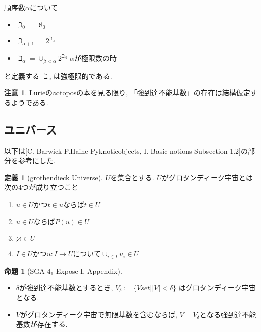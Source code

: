 \documentclass[dvipdfmx,a4paper,11pt]{article}
\theoremstyle{definition}
\newtheorem{prop}[thm]{命題}
\newtheorem{dfn}[thm]{定義}
\newtheorem{rem}[thm]{注意}
\begin{document}
順序数$\alpha$について

\begin{itemize}
\item $\beth_0 = \aleph_0$
\item $\beth_{\alpha+1}= 2^{\beth_{\alpha}}$
\item $\beth_{\alpha}= \cup_{\beta < \alpha }2^{\beth_{\beta}}$ $\alpha$が極限数の時
\end{itemize}
と定義する
$\beth_{\omega}$は強極限的である. 


\begin{rem}
Lurieの$\infty$toposの本を見る限り, 「強到達不能基数」の存在は結構仮定するようである. 
\end{rem}
\subsection{ユニバース}
以下は[C. Barwick P.Haine Pyknoticobjects, I. Basic notions Subsection 1.2]の部分を参考にした. 

 \begin{tcolorbox}
 [colback = white, colframe = green!35!black, fonttitle = \bfseries,breakable = true]
\begin{dfn}[grothendieck Universe]
$U$を集合とする. $U$がグロタンディーク宇宙とは次の4つが成り立つこと
\begin{enumerate}
\item $u \in U$かつ$t \in u$ならば$t \in U$
\item $u \in U$ならば$P(u) \in U$
\item $\varnothing \in U$
\item $I \in U$かつ$u : I \to U$について$\cup_{i \in I} u_i \in U$
\end{enumerate}
\end{dfn}
\end{tcolorbox}

 \begin{tcolorbox}
 [colback = white, colframe = green!35!black, fonttitle = \bfseries,breakable = true]
\begin{prop}[SGA $4_1$ Expose I, Appendix]
\begin{itemize}
\item $\delta$が強到達不能基数とするとき, 
$V_{\delta} := \{ V set |  |V| < \delta\}$
はグロタンディーク宇宙となる.
\item $V$がグロタンディーク宇宙で無限基数を含むならば, $V = V_{\delta}$となる強到達不能基数が存在する.
\end{itemize}
\end{prop}
\end{tcolorbox}
\end{document}
